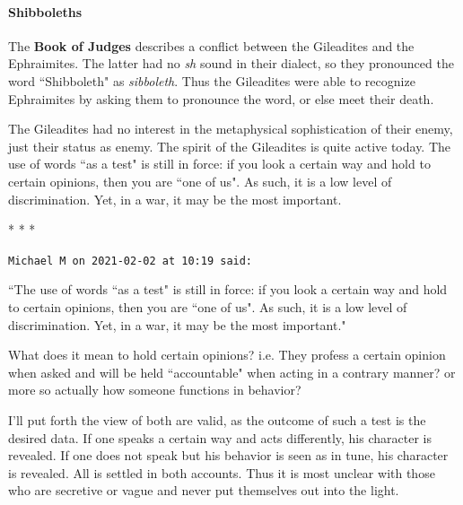 \paragraph{Shibboleths}


The \textbf{Book of Judges} describes a conflict between the Gileadites and the Ephraimites. The latter had no \emph{sh} sound in their dialect, so they pronounced the word ``Shibboleth" as \emph{sibboleth}. Thus the Gileadites were able to recognize Ephraimites by asking them to pronounce the word, or else meet their death.

The Gileadites had no interest in the metaphysical sophistication of their enemy, just their status as enemy. The spirit of the Gileadites is quite active today. The use of words ``as a test" is still in force: if you look a certain way and hold to certain opinions, then you are ``one of us". As such, it is a low level of discrimination. Yet, in a war, it may be the most important.




\begin{center}* * *\end{center}

\begin{footnotesize}\begin{sffamily}



\texttt{Michael M on 2021-02-02 at 10:19 said: }

``The use of words ``as a test" is still in force: if you look a certain way and hold to certain opinions, then you are ``one of us". As such, it is a low level of discrimination. Yet, in a war, it may be the most important."

What does it mean to hold certain opinions? i.e. They profess a certain opinion when asked and will be held ``accountable" when acting in a contrary manner? or more so actually how someone functions in behavior?

I'll put forth the view of both are valid, as the outcome of such a test is the desired data. If one speaks a certain way and acts differently, his character is revealed. If one does not speak but his behavior is seen as in tune, his character is revealed. All is settled in both accounts. Thus it is most unclear with those who are secretive or vague and never put themselves out into the light.


\end{sffamily}\end{footnotesize}
